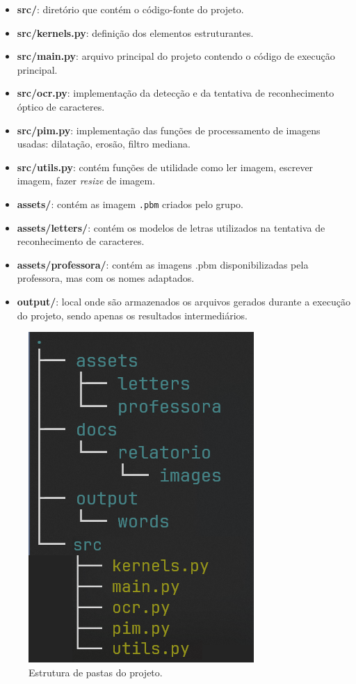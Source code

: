 \documentclass[english, 
               brazil, 
               bsc] %
               {dcomp-abntex2}
\begin{document}
\begin{itemize}
\item \textbf{src/}: diretório que contém o código-fonte do projeto.
\item \textbf{src/kernels.py}: definição dos elementos estruturantes.
\item \textbf{src/main.py}: arquivo principal do projeto contendo o código de execução principal.
\item \textbf{src/ocr.py}: implementação da detecção e da tentativa de reconhecimento óptico de caracteres.
\item \textbf{src/pim.py}: implementação das funções de processamento de imagens usadas: dilatação, erosão, filtro mediana.
\item \textbf{src/utils.py}: contém funções de utilidade como ler imagem, escrever imagem, fazer \textit{resize} de imagem.
\item \textbf{assets/}: contém as imagem \texttt{.pbm} criados pelo grupo.
\item \textbf{assets/letters/}: contém os modelos de letras utilizados na tentativa de reconhecimento de caracteres.
\item \textbf{assets/professora/}: contém as imagens .pbm disponibilizadas pela professora, mas com os nomes adaptados.
\item \textbf{output/}: local onde são armazenados os arquivos gerados durante a execução do projeto, sendo apenas os resultados intermediários.
\end{itemize}


\begin{figure}[htb]
\caption{\small Estrutura de pastas do projeto.}
\label{folders}
    \begin{center}
    \includegraphics[scale=0.65]{./images/folders.png}
    \end{center}
\end{figure}
\end{document}
